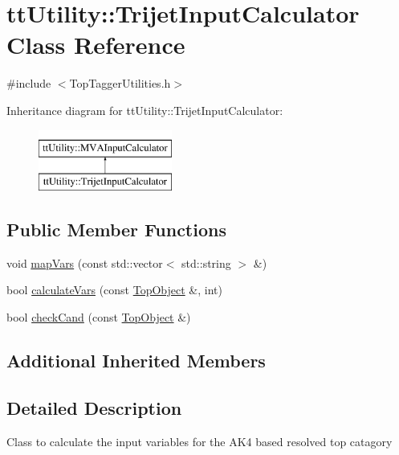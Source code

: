 \hypertarget{classttUtility_1_1TrijetInputCalculator}{\section{tt\-Utility\-:\-:Trijet\-Input\-Calculator Class Reference}
\label{classttUtility_1_1TrijetInputCalculator}
}


{\ttfamily \#include $<$Top\-Tagger\-Utilities.\-h$>$}

Inheritance diagram for tt\-Utility\-:\-:Trijet\-Input\-Calculator\-:\begin{figure}[H]
\begin{center}
\leavevmode
\includegraphics[height=2.000000cm]{classttUtility_1_1TrijetInputCalculator}
\end{center}
\end{figure}
\subsection*{Public Member Functions}
\begin{DoxyCompactItemize}
\item 
void \hyperlink{classttUtility_1_1TrijetInputCalculator_a22f76e3d58040a99324f6748f340a4fc}{map\-Vars} (const std\-::vector$<$ std\-::string $>$ \&)
\item 
bool \hyperlink{classttUtility_1_1TrijetInputCalculator_ab691e5a8ecd3698a609b34b6e6aff20d}{calculate\-Vars} (const \hyperlink{classTopObject}{Top\-Object} \&, int)
\item 
bool \hyperlink{classttUtility_1_1TrijetInputCalculator_abeb8edb896b264a185a2f37747a97912}{check\-Cand} (const \hyperlink{classTopObject}{Top\-Object} \&)
\end{DoxyCompactItemize}
\subsection*{Additional Inherited Members}


\subsection{Detailed Description}
Class to calculate the input variables for the A\-K4 based resolved top catagory 

